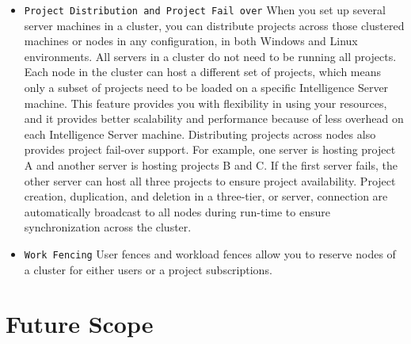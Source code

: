\documentclass[12pt]{article}
\begin{document}
\begin{itemize}
\item
\texttt{Project Distribution and Project Fail over}
When you set up several server machines in a cluster, you can distribute projects across those clustered machines or nodes in any configuration, in both Windows and Linux environments. All servers in a cluster do not need to be running all projects. Each node in the cluster can host a different set of projects, which means only a subset of projects need to be loaded on a specific Intelligence Server machine. This feature provides you with flexibility in using your resources, and it provides better scalability and performance because of less overhead on each Intelligence Server machine. Distributing projects across nodes also provides project fail-over support. For example, one server is hosting project A and another server is hosting projects B and C. If the first server fails, the other server can host all three projects to ensure project availability. Project creation, duplication, and deletion in a three-tier, or server, connection are automatically broadcast to all nodes during run-time to ensure synchronization across the cluster.
\item
\texttt{Work Fencing}
User fences and workload fences allow you to reserve nodes of a cluster for either users or a project subscriptions. 

\end{itemize}

\newpage
\section{Future Scope}

\newpage
\end{document}
